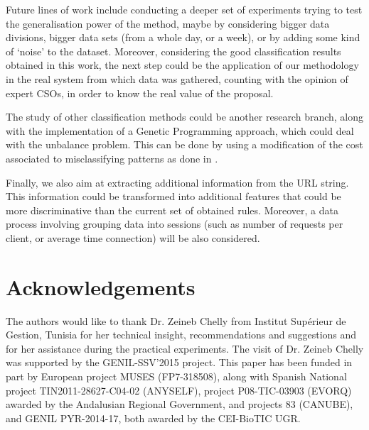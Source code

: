 \documentclass{llncs}
\begin{document}
Future lines of work include conducting a deeper set of experiments trying to test the generalisation power of the method, 
maybe by considering bigger data divisions, bigger data sets (from a whole day, or a week), or by adding some kind 
of `noise' to the dataset.
Moreover, considering the good classification results obtained in this work, the next step could be the application 
of our methodology in the real system from which data was gathered, counting with the opinion of expert CSOs, in order 
to know the real value of the proposal.

The study of other classification methods could be another research branch, along with the implementation of a Genetic 
Programming approach, which could deal with the unbalance problem. This can be done by using a modification of the 
cost associated to misclassifying patterns as done  in \cite{cost_adjustment_07}.

Finally, we also aim at extracting additional information from the URL string. This information could be transformed 
into additional features that could be more discriminative than the current set of obtained rules. Moreover, a data 
process involving grouping data into sessions (such as number of requests per client, or average time connection) 
will be also considered.


\section*{Acknowledgements}
The authors would like to thank Dr. Zeineb Chelly from Institut Sup\'erieur de Gestion, Tunisia for her technical insight, recommendations and suggestions and for her assistance during the practical experiments. The visit of Dr. Zeineb Chelly was supported by the GENIL-SSV'2015 project. This paper has been funded in part by European project MUSES (FP7-318508), along with Spanish National project TIN2011-28627-C04-02 (ANYSELF), project P08-TIC-03903 (EVORQ) awarded by the Andalusian Regional Government, and projects 83 (CANUBE), and GENIL PYR-2014-17, both awarded by the CEI-BioTIC UGR.



\end{document}
